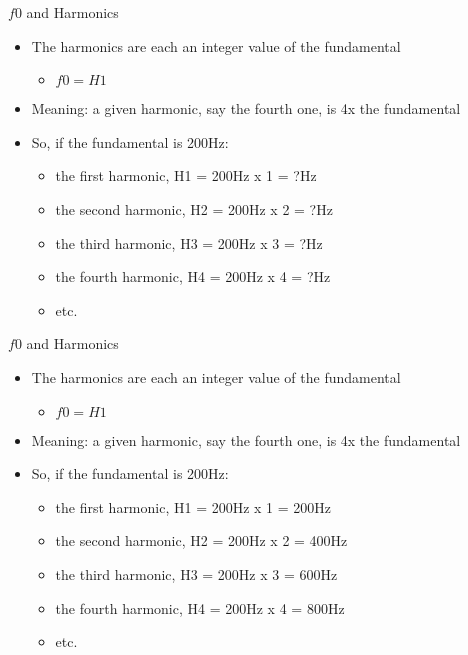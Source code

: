 \documentclass[professionalfonts]{beamer}
\begin{document}
\begin{frame}{$f0$ and Harmonics}
    \begin{itemize}
        \item The harmonics are each an integer value of the fundamental
        \begin{itemize}
            \item $f0 = H1$ 
        \end{itemize}
        \item Meaning: a given harmonic, say the fourth one, is 4x the fundamental
        \item So, if the fundamental is 200Hz: 
        \begin{itemize}
            \item the first harmonic, H1 = 200Hz x 1 = ?Hz 
            \item the second harmonic, H2 = 200Hz x 2 = ?Hz 
            \item the third harmonic, H3 = 200Hz x 3 = ?Hz 
            \item the fourth harmonic, H4 = 200Hz x 4 = ?Hz 
            \item etc.
        \end{itemize}
    \end{itemize}
\end{frame}

\begin{frame}{$f0$ and Harmonics}
    \begin{itemize}
        \item The harmonics are each an integer value of the fundamental
        \begin{itemize}
            \item $f0 = H1$ 
        \end{itemize}
        \item Meaning: a given harmonic, say the fourth one, is 4x the fundamental
        \item So, if the fundamental is 200Hz: 
        \begin{itemize}
            \item the first harmonic, H1 = 200Hz x 1 = 200Hz 
            \item the second harmonic, H2 = 200Hz x 2 = 400Hz 
            \item the third harmonic, H3 = 200Hz x 3 = 600Hz 
            \item the fourth harmonic, H4 = 200Hz x 4 = 800Hz 
            \item etc.
        \end{itemize}
    \end{itemize}
\end{frame}
\end{document}
